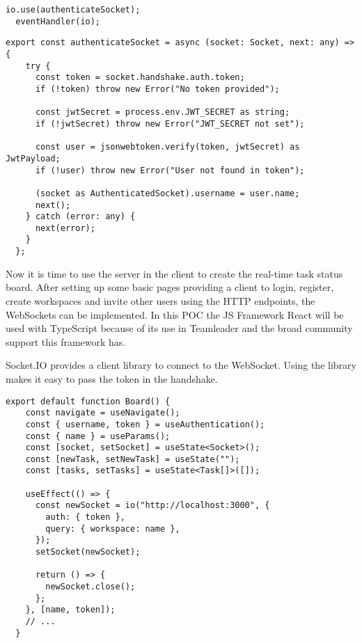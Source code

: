 \begin{lstlisting}[caption=Using Middleware]
  io.use(authenticateSocket);
  eventHandler(io);
\end{lstlisting}

\begin{lstlisting}[caption=Auth Middleware for the socket]
  export const authenticateSocket = async (socket: Socket, next: any) => {
    try {
      const token = socket.handshake.auth.token;
      if (!token) throw new Error("No token provided");
   
      const jwtSecret = process.env.JWT_SECRET as string;
      if (!jwtSecret) throw new Error("JWT_SECRET not set");
   
      const user = jsonwebtoken.verify(token, jwtSecret) as JwtPayload;
      if (!user) throw new Error("User not found in token");
   
      (socket as AuthenticatedSocket).username = user.name;
      next();
    } catch (error: any) {
      next(error);
    }
  };
\end{lstlisting}

Now it is time to use the server in the client to create the real-time task status board. After setting up some basic pages providing a client to login, register, create workspaces and invite other users using the HTTP endpoints, the WebSockets can be implemented. In this POC the JS Framework React will be used with TypeScript because of its use in Teamleader and the broad community support this framework has.

Socket.IO provides a client library to connect to the WebSocket. Using the library makes it easy to pass the token in the handshake.

\begin{lstlisting}[caption=Using the WebSocket]
  export default function Board() {
    const navigate = useNavigate();
    const { username, token } = useAuthentication();
    const { name } = useParams();
    const [socket, setSocket] = useState<Socket>();
    const [newTask, setNewTask] = useState("");
    const [tasks, setTasks] = useState<Task[]>([]);
   
    useEffect(() => {
      const newSocket = io("http://localhost:3000", {
        auth: { token },
        query: { workspace: name },
      });
      setSocket(newSocket);
   
      return () => {
        newSocket.close();
      };
    }, [name, token]);
    // ... 
  }  
\end{lstlisting}

